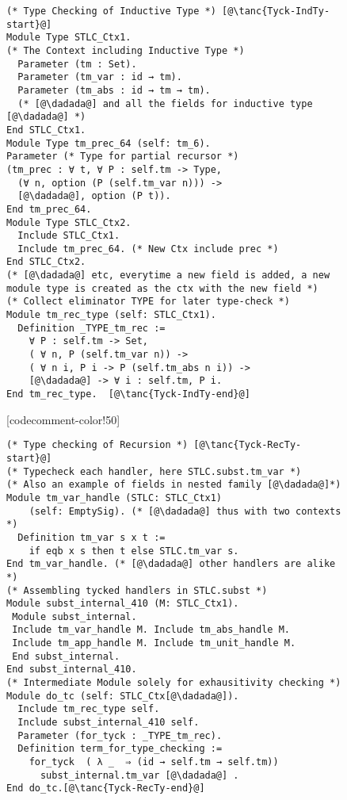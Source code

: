 \begin{figure}

\begin{minipage}{\textwidth}
\begin{multicols}{2}




\begin{lstlisting}
(* Type Checking of Inductive Type *) [@\tanc{Tyck-IndTy-start}@]
Module Type STLC_Ctx1. 
(* The Context including Inductive Type *)
  Parameter (tm : Set).
  Parameter (tm_var : id → tm).
  Parameter (tm_abs : id → tm → tm).
  (* [@\dadada@] and all the fields for inductive type [@\dadada@] *)
End STLC_Ctx1.
Module Type tm_prec_64 (self: tm_6). 
Parameter (* Type for partial recursor *)
(tm_prec : ∀ t, ∀ P : self.tm -> Type,
  (∀ n, option (P (self.tm_var n))) -> 
  [@\dadada@], option (P t)).
End tm_prec_64.
Module Type STLC_Ctx2.  
  Include STLC_Ctx1.
  Include tm_prec_64. (* New Ctx include prec *)
End STLC_Ctx2.
(* [@\dadada@] etc, everytime a new field is added, a new 
module type is created as the ctx with the new field *)
(* Collect eliminator TYPE for later type-check *)
Module tm_rec_type (self: STLC_Ctx1).
  Definition _TYPE_tm_rec :=
    ∀ P : self.tm -> Set,
    ( ∀ n, P (self.tm_var n)) ->
    ( ∀ n i, P i -> P (self.tm_abs n i)) ->
    [@\dadada@] -> ∀ i : self.tm, P i.
End tm_rec_type.  [@\tanc{Tyck-IndTy-end}@]
\end{lstlisting}

[codecomment-color!50]



\begin{lstlisting}
(* Type checking of Recursion *) [@\tanc{Tyck-RecTy-start}@]
(* Typecheck each handler, here STLC.subst.tm_var *)
(* Also an example of fields in nested family [@\dadada@]*) 
Module tm_var_handle (STLC: STLC_Ctx1)
    (self: EmptySig). (* [@\dadada@] thus with two contexts *) 
  Definition tm_var s x t := 
    if eqb x s then t else STLC.tm_var s.
End tm_var_handle. (* [@\dadada@] other handlers are alike *)
(* Assembling tycked handlers in STLC.subst *)
Module subst_internal_410 (M: STLC_Ctx1). 
 Module subst_internal.
 Include tm_var_handle M. Include tm_abs_handle M.
 Include tm_app_handle M. Include tm_unit_handle M.
 End subst_internal.
End subst_internal_410.
(* Intermediate Module solely for exhausitivity checking *) 
Module do_tc (self: STLC_Ctx[@\dadada@]).
  Include tm_rec_type self. 
  Include subst_internal_410 self.
  Parameter (for_tyck : _TYPE_tm_rec).
  Definition term_for_type_checking :=
    for_tyck  ( λ _  ⇒ (id → self.tm → self.tm))
      subst_internal.tm_var [@\dadada@] .
End do_tc.[@\tanc{Tyck-RecTy-end}@]
\end{lstlisting}


\end{multicols}
\end{minipage}
\end{figure}

